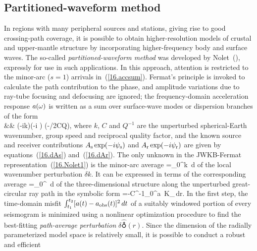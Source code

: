 \subsection{Partitioned-waveform method}
%

In regions with many peripheral sources and stations,
giving rise to good crossing-path coverage, it is
possible to obtain higher-resolution models of
crustal and upper-mantle structure by
incorporating higher-frequency body and surface waves.
The so-called {\em partitioned-waveform method\/}
was developed by Nolet~(\citeyear{nolet90}),
expressly for use in such applications.
In this approach, attention is restricted
to the minor-arc ($s=1$) arrivals in~(\ref{16.accsum}).
Fermat's principle is invoked to calculate the path
contribution to the phase, and amplitude variations
due to ray-tube focusing and defocusing are ignored;
the frequency-domain acceleration response $a(\mbox{$\omega$})$
is written as a sum over surface-wave modes or dispersion
branches of the form
\eqa \label{16.Nolet1}
  \nonumber\\
&&\mbox{}
\times\exp (-ik\Theta)\exp(-i\,\delta{}\,\Theta)
\exp(-\om\Theta/2CQ),
\ena
where $k$, $C$ and $Q^{-1}$ are the unperturbed spherical-Earth
wavenumber, group speed and reciprocal quality factor, and
the known source and receiver contributions
$A_{\rm s}\exp(-i\psi_{\rm s})$ and $A_{\rm r}\exp(-i\psi_{\rm r})$
are given by equations~(\ref{16.dAs}) and~(\ref{16.dAr}).
The only unknown in the JWKB-Fermat representation~(\ref{16.Nolet1})
is the minor-arc average
\eq
\delta{}=\int_0^\Theta\delta k
\,d\Delta
\en
of the local wavenumber perturbation
$\delta k$.  It can be expressed in terms of the
corresponding average
\eq \label{16.Nolet2}
\delta\hat{\earth}
=\int_0^\Theta\delta\earth
\,d\Delta
\en
of the three-dimensional structure
along the unperturbed great-circular
ray path in the symbolic form
\eq \label{16.Nolet3}
\delta{}=-C^{-1}\int_0^a
\delta\hat{\earth}\,K_{\subearth}\,dr.
\en
In the first step, the time-domain misfit
$\int_{t_1}^{t_2}[a(t)-a_{\rm obs}(t)]^2\,dt$
of a suitably windowed portion of every seismogram
is minimized using a nonlinear optimization procedure
to find the best-fitting {\em path-average perturbation\/}
%
$\delta\hat{\earth}(r)$.  Since the dimension of the
radially parameterized model space is relatively
small, it is possible to conduct a robust and efficient
